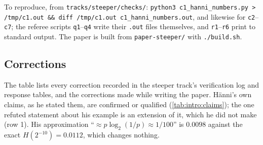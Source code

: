 \noindent To reproduce, from \texttt{tracks/steeper/checks/}: \texttt{python3 c1\_hanni\_numbers.py > /tmp/c1.out \&\& diff /tmp/c1.out c1\_hanni\_numbers.out}, and likewise for \texttt{c2}--\texttt{c7}; the referee scripts \texttt{q1}--\texttt{q4} write their \texttt{.out} files themselves, and \texttt{r1}--\texttt{r6} print to standard output. The paper is built from \texttt{paper-steeper/} with \texttt{./build.sh}.

\subsection{Corrections}\label{app:verification:corrections}

The table lists every correction recorded in the steeper track's verification log and response tables, and the corrections made while writing the paper. H\"anni's own claims, as he stated them, are confirmed or qualified (\cref{tab:intro:claims}); the one refuted statement about his example is an extension of it, which he did not make (row 1). His approximation ``$\approx p\log_2(1/p)\approx1/100$'' is $0.0098$ against the exact $H(2^{-10})=0.0112$, which changes nothing.

